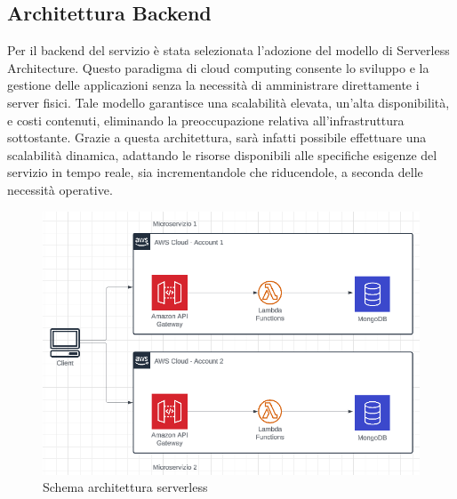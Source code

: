 \documentclass{article}
\begin{document}
\subsection{Architettura Backend}
Per il backend del servizio è stata selezionata l'adozione del modello di Serverless Architecture. Questo paradigma di cloud computing consente lo sviluppo e la gestione delle applicazioni senza la necessità di amministrare direttamente i server fisici. Tale modello garantisce una scalabilità elevata, un'alta disponibilità, e costi contenuti, eliminando la preoccupazione relativa all'infrastruttura sottostante. Grazie a questa architettura, sarà infatti possibile effettuare una scalabilità dinamica, adattando le risorse disponibili alle specifiche esigenze del servizio in tempo reale, sia incrementandole che riducendole, a seconda delle necessità operative.
 \begin{figure}[H]
      \centering
      \includegraphics{documenti/grafici/schema serverless architecture pattern.png}
      \caption{Schema architettura serverless}
      \label{fig: archser}
    \end{figure}
\end{document}
